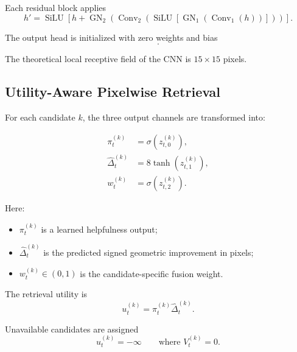 \documentclass[11pt,a4paper]{article}
\begin{document}
Each residual block applies
%
\begin{equation}
h'
=
\operatorname{SiLU}
\left[
h+
\operatorname{GN}_2
\left(
\operatorname{Conv}_2
\left(
\operatorname{SiLU}
\left[
\operatorname{GN}_1
\left(
\operatorname{Conv}_1(h)
\right)
\right]
\right)
\right)
\right].
\end{equation}

The output head is initialized with zero weights and bias
%
\begin{equation}
[-2,\;0,\;-3].
\end{equation}

The theoretical local receptive field of the CNN is \(15\times15\)
pixels.

\subsection{Utility-Aware Pixelwise Retrieval}
\label{sec:retrieval}

For each candidate \(k\), the three output channels are transformed into:

\begin{align}
\pi_t^{(k)}
&=
\sigma
\left(
z_{t,0}^{(k)}
\right),
\label{eq:helpfulness_probability}
\\
\widehat{\Delta}_t^{(k)}
&=
8
\tanh
\left(
z_{t,1}^{(k)}
\right),
\label{eq:predicted_improvement}
\\
w_t^{(k)}
&=
\sigma
\left(
z_{t,2}^{(k)}
\right).
\label{eq:candidate_fusion_weight}
\end{align}

Here:

\begin{itemize}
    \item \(\pi_t^{(k)}\) is a learned helpfulness output;
    \item \(\widehat{\Delta}_t^{(k)}\) is the predicted signed geometric
    improvement in pixels;
    \item \(w_t^{(k)}\in(0,1)\) is the candidate-specific fusion weight.
\end{itemize}

The retrieval utility is
%
\begin{equation}
u_t^{(k)}
=
\pi_t^{(k)}
\widehat{\Delta}_t^{(k)}.
\label{eq:retrieval_utility}
\end{equation}

Unavailable candidates are assigned
%
\begin{equation}
u_t^{(k)}
=
-\infty
\qquad
\text{where }
V_t^{(k)}=0.
\label{eq:invalid_score_masking}
\end{equation}
\end{document}
